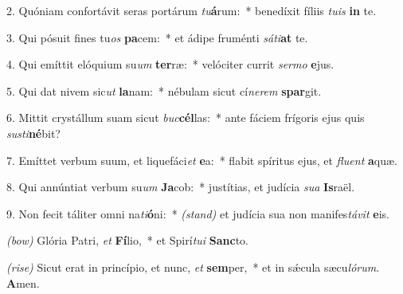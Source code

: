 2. Quóniam confortávit seras portárum \textit{tu}\textbf{á}rum:~* benedíxit fíliis \textit{tu}\textit{is} \textbf{in} te.

3. Qui pósuit fines tu\textit{os} \textbf{pa}cem:~* et ádipe fruménti \textit{sá}\textit{ti}\textbf{at} te.

4. Qui emíttit elóquium su\textit{um} \textbf{ter}ræ:~* velóciter currit \textit{ser}\textit{mo} \textbf{e}jus.

5. Qui dat nivem sic\textit{ut} \textbf{la}nam:~* nébulam sicut cí\textit{ne}\textit{rem} \textbf{spar}git.

6. Mittit crystállum suam sicut \textit{buc}\textbf{cél}las:~* ante fáciem frígoris ejus quis \textit{sus}\textit{ti}\textbf{né}bit?

7. Emíttet verbum suum, et liquefáci\textit{et} \textbf{e}a:~* flabit spíritus ejus, et \textit{flu}\textit{ent} \textbf{a}quæ.

8. Qui annúntiat verbum su\textit{um} \textbf{Ja}cob:~* justítias, et judícia \textit{su}\textit{a} \textbf{Is}raël.

9. Non fecit táliter omni na\textit{ti}\textbf{ó}ni:~* {\color{red}\textit{(stand)}} et judícia sua non manifes\textit{tá}\textit{vit} \textbf{e}is.

{\color{red}\textit{(bow)}} Glória Patri, \textit{et} \textbf{Fí}lio,~* et Spirí\textit{tu}\textit{i} \textbf{Sanc}to.

{\color{red}\textit{(rise)}} Sicut erat in princípio, et nunc, \textit{et} \textbf{sem}per,~* et in s\'{\ae}cula sæcu\textit{ló}\textit{rum}. \textbf{A}men.